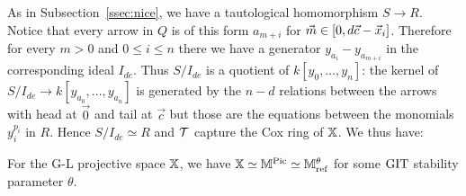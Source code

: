 \documentclass[12pt]{amsart}
\begin{document}
As in Subsection~\ref{ssec:nice}, we have a tautological homomorphism $S \rightarrow R$.
Notice that every arrow in $Q$ is of this form $a_{m+i}$ for ${\vec{m}} \in [0, d{\vec{c}} - {\vec{x}}_i]$.
Therefore for every $m>0$ and $0\leq i\leq n$ there we have a generator $y_{a_i} - y_{a_{m+i}}$ in the corresponding ideal $I_{de}$.
Thus $S/I_{de}$ is a quotient of $k[y_0,\ldots, y_n]$: the kernel of $S/I_{de} \rightarrow k[y_{a_0},\ldots, y_{a_n}]$ is generated by the $n-d$ relations between the arrows with head at $\vec{0}$ and tail at $\vec{c}$ but those are the equations between the monomials $y_{i}^{p_i}$ in $R$.
Hence $S/I_{de} \simeq R$ and $\mathcal{T}$ capture the Cox ring of $\mathbb{X}$.
We thus have:

\begin{corollary} \label{cr:HIMO}
For the G-L projective space $\mathbb{X}$, we have $\mathbb{X} \simeq \mathbb{M}^{\operatorname{Pic}} \simeq \mathbb{M}^\theta_\textup{ref}$ for some $\textup{GIT}$ stability parameter $\theta$.
\end{corollary}



\end{document}
